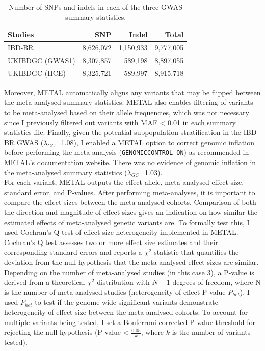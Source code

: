 \begin{table}[H]
  \caption{Number of SNPs and indels in each of the three GWAS summary statistics.}
  \centering
  \begin{tabular}[t]{lrrr}
  \toprule
  \textbf{Studies} & \textbf{SNP} & \textbf{Indel} & \textbf{Total}\\
  \midrule
  IBD-BR & 8,626,072 & 1,150,933 & 9,777,005\\
  UKIBDGC (GWAS1) & 8,307,857 & 589,198 & 8,897,055\\
  UKIBDGC (HCE) & 8,325,721 & 589,997 & 8,915,718\\
  \bottomrule
  \end{tabular}
  \end{table}

Moreover, METAL automatically aligns any variants that may be flipped between the meta-analysed summary statistics. METAL also enables filtering of variants to be meta-analysed based on their allele frequencies, which was not necessary since I previously filtered out variants with MAF < 0.01 in each summary statistics file. Finally, given the potential subpopulation stratification in the IBD-BR GWAS ($\lambda_{GC}$=1.08), I enabled a METAL option to correct genomic inflation before performing the meta-analysis (\Verb+GENOMICCONTROL ON+) as recommended in METAL's documentation website. There was no evidence of genomic inflation in the meta-analysed summary statistics ($\lambda_{GC}$=1.03).\\

For each variant, METAL outputs the effect allele, meta-analysed effect size, standard error, and P-values. After performing meta-analyses, it is important to compare the effect sizes between the meta-analysed cohorts. Comparison of both the direction and magnitude of effect sizes gives an indication on how similar the estimated effects of meta-analysed genetic variants are. To formally test this, I used Cochran's Q test of effect size heterogeneity implemented in METAL. Cochran's Q test assesses two or more effect size estimates and their corresponding standard errors and reports a $\chi^{2}$ statistic that quantifies the deviation from the null hypothesis that the meta-analysed effect sizes are similar. Depending on the number of meta-analysed studies (in this case 3), a P-value is derived from a theoretical $\chi^{2}$ distribution with $N-1$ degrees of freedom, where N is the number of meta-analysed studies (heterogeneity of effect P-value $P_{het}$). I used $P_{het}$ to test if the genome-wide significant variants demonstrate heterogeneity  of effect size between the meta-analysed cohorts. To account for multiple variants being tested, I set a Bonferroni-corrected P-value threshold for rejecting the null hypothesis (P-value < $\frac{0.05}{k}$, where $k$ is the number of variants tested).

